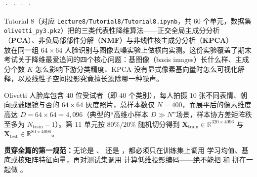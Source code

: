 

 ·  ·  ·  · 



Tutorial 8（对应 \texttt{Lecture8/Tutorial8/Tutorial8.ipynb}，共 60 个单元，数据集 \texttt{olivetti\_py3.pkz}）把的三类代表性降维算法——正交全局主成分分析（\textbf{PCA}）、非负局部部件分解（\textbf{NMF}）与非线性核主成分分析（\textbf{KPCA}）——放在同一组 $64\times 64$ 人脸识别与图像去噪实验上做横向实测。这份实验覆盖了期末考试关于降维最爱追问的四个核心问题：基图像（basis images）长什么样、主成分个数 $K$ 怎么影响下游分类精度、KPCA 没有显式像素基向量时怎么可视化解释，以及线性子空间投影究竟擅长滤除哪一种噪声。



Olivetti 人脸库包含 $40$ 位受试者（即 $40$ 个类别），每人拍摄 $10$ 张不同表情、朝向或戴眼镜与否的 $64\times 64$ 灰度照片，总样本数仅 $N = 400$，而展平后的像素维度高达 $D = 64\times 64 = 4{,}096$（典型的“高维小样本 $D \gg N$”场景，样本协方差矩阵秩至多为 $N_{\mathrm{train}} - 1$）。第 11 单元按 $80\%/20\%$ 随机切分得到 $\mathbf{X}_{\mathrm{train}} \in \mathbb{R}^{320 \times 4096}$ 与 $\mathbf{X}_{\mathrm{test}} \in \mathbb{R}^{80 \times 4096}$。

\textbf{贯穿全篇的第一规范：}无论是 、 还是 ，都必须只在训练集上调用  学习均值、基底或核矩阵特征向量，再对测试集调用 \textbf{} 计算低维投影编码——绝不能把  和  拼在一起做 。



